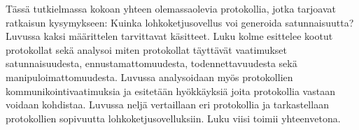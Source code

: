 
Tässä tutkielmassa kokoan yhteen olemassaolevia protokollia, jotka tarjoavat ratkaisun kysymykseen: Kuinka lohkoketjusovellus voi generoida satunnaisuutta? Luvussa kaksi määrittelen tarvittavat käsitteet. Luku kolme esittelee kootut protokollat sekä analysoi miten protokollat täyttävät vaatimukset satunnaisuudesta, ennustamattomuudesta, todennettavuudesta sekä manipuloimattomuudesta. Luvussa analysoidaan myös protokollien kommunikointivaatimuksia ja esitetään hyökkäyksiä joita protokollia vastaan voidaan kohdistaa. Luvussa neljä vertaillaan eri protokollia ja tarkastellaan protokollien sopivuutta lohkoketjusovelluksiin. Luku viisi toimii yhteenvetona.
